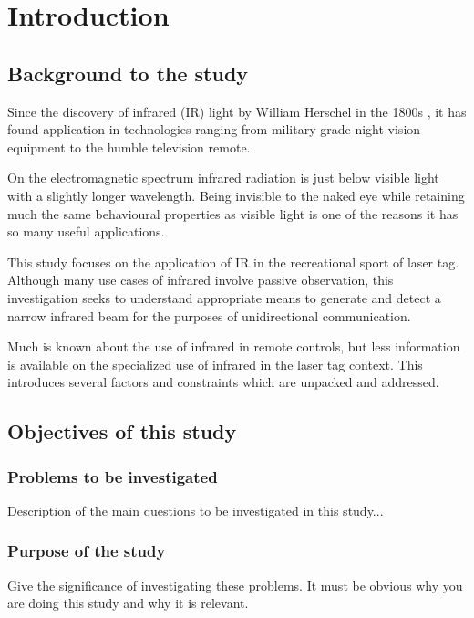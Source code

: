 \chapter{Introduction}

\section{Background to the study}
Since the discovery of infrared (IR) light by William Herschel in the 1800s \cite{Rowan-Robinson2013}, it has found application in technologies ranging from military grade night vision equipment to the humble television remote.

On the electromagnetic spectrum infrared radiation is just below visible light with a slightly longer wavelength. Being invisible to the naked eye while retaining much the same behavioural properties as visible light is one of the reasons it has so many useful applications.

This study focuses on the application of IR in the recreational sport of laser tag. Although many use cases of infrared involve passive observation, this investigation seeks to understand appropriate means to generate and detect a narrow infrared beam for the purposes of unidirectional communication.

Much is known about the use of infrared in remote controls, but less information is available on the specialized use of infrared in the laser tag context. This introduces several factors and constraints which are unpacked and addressed.



\section{Objectives of this study}
\subsection{Problems to be investigated}
Description of the main questions to be investigated in this study...
\subsection{Purpose of the study}
Give the significance of investigating these problems. It must be obvious why you are doing this study
and why it is relevant.

